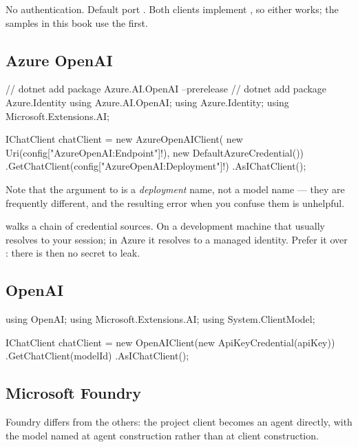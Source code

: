 No authentication. Default port . Both clients implement
, so either works; the samples in this book use the first.

\subsection{Azure OpenAI}

\begin{csharp}[caption={Azure OpenAI with credential-based authentication}, label={lst:prov-azure}]
// dotnet add package Azure.AI.OpenAI --prerelease
// dotnet add package Azure.Identity
using Azure.AI.OpenAI;
using Azure.Identity;
using Microsoft.Extensions.AI;

IChatClient chatClient = new AzureOpenAIClient(
        new Uri(config["AzureOpenAI:Endpoint"]!),
        new DefaultAzureCredential())
    .GetChatClient(config["AzureOpenAI:Deployment"]!)
    .AsIChatClient();
\end{csharp}

Note that the argument to  is a \emph{deployment} name, not a
model name --- they are frequently different, and the resulting error when you
confuse them is unhelpful.

 walks a chain of credential sources. On a
development machine that usually resolves to your  session; in
Azure it resolves to a managed identity. Prefer it over
: there is then no secret to leak.

\subsection{OpenAI}

\begin{csharp}[caption={OpenAI}, label={lst:prov-openai}]
using OpenAI;
using Microsoft.Extensions.AI;
using System.ClientModel;

IChatClient chatClient = new OpenAIClient(new ApiKeyCredential(apiKey))
    .GetChatClient(modelId)
    .AsIChatClient();
\end{csharp}

\subsection{Microsoft Foundry}

Foundry differs from the others: the project client becomes an agent directly,
with the model named at agent construction rather than at client construction.

